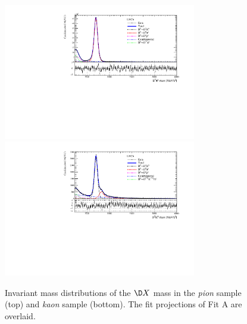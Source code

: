 \begin{figure}[tbp]
    \centering
    \includegraphics[width=0.75\textwidth]{08MassFit/figs/MDFit_BeautyMass_Bd2DPi_withPulls.pdf}
    \includegraphics[width=0.75\textwidth]{08MassFit/figs/MDFit_BeautyMass_Bd2DK_withPulls.pdf}
    \caption{Invariant mass distributions of the $\D X$ mass in the \emph{pion} sample (top) and \emph{kaon} sample (bottom).
    The fit projections of Fit A are overlaid.}
    \label{fig:MassFitPlot}
\end{figure}


